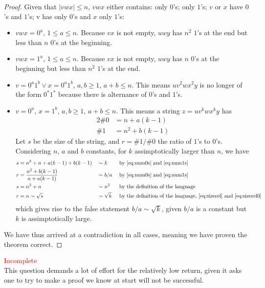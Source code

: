 \documentclass[docid=TP10]{tcom_TP}
\begin{document}
{\begin{proof}
Given that $|vwx|\leq n$, $vwx$ either contains: only $0$'s; only $1$'s; $v$ or $x$ have $0$'s and $1$'s; v has only $0$'s and $x$ only $1$'s:
\begin{itemize}
	\item $vwx=0^a$, $1 \leq a \leq n$. Because $vx$ is not empty, $uwy$ has $n^2$ $1$'s at the end but less than $n$ $0$'s at the beginning.
	\item $vwx=1^a$, $1 \leq a \leq n$. Because $vx$ is not empty, $uwy$ has $n$ $0$'s at the beginning but less than $n^2$ $1$'s at the end.
	\item $v=0^a1^b \vee x=0^a1^b$, $a,b \geq 1$, $a+b \leq n$. This means $uv^2wx^2y$ is no longer of the form $0^*1^*$ because there is alternance of $0$'s and $1$'s.
	\item $v=0^a$, $x=1^b$, $a,b \geq 1$, $a+b \leq n$. This means a string $z=uv^kwx^ky$ has
	\begin{alignat}{2}
		\label{eq:num0s} \# 0 &= n+a(k-1)\\
		\label{eq:num1s} \# 1 &= n^2+b(k-1)
	\end{alignat}
	Let $s$ be the size of the string, and $r=\#1/\#0$ the ratio of $1$'s to $0$'s. Considering $n$, $a$ and $b$ constants, for $k$ assimptotically larger than $n$, we have
	\begin{alignat}{3}
		\label{eq:sizerel0} s &= n^2+n+a(k-1)+b(k-1)         &&\sim k        &&\text{ by \eqref{eq:num0s} and \eqref{eq:num1s}} \\
		r &= \frac{n^2+b(k-1)}{n+a(k-1)} &&\sim b/a      &&\text{ by \eqref{eq:num0s} and \eqref{eq:num1s}} \\
		\label{eq:sizerel} s &= n^2+n    &&\sim n^2      &&\text{ by the definition of the language}\\
		r &= n \sim \sqrt{s}             &&\sim \sqrt{k} &&\text{ by  the definition of the language, \eqref{eq:sizerel} and \eqref{eq:sizerel0}}
	\end{alignat}
	which gives rise to the false statement $b/a \sim \sqrt{k}$, given $b/a$ is a constant but $k$ is assimptotically large.
\end{itemize}
We have thus arrived at a contradiction in all cases, meaning we have proven the theorem correct.
\end{proof}
\textcolor{red}{Incomplete}\\
This question demands a lot of effort for the relatively low return, given it asks one to try to make a proof we know at start will not be successful.
}
\end{document}
